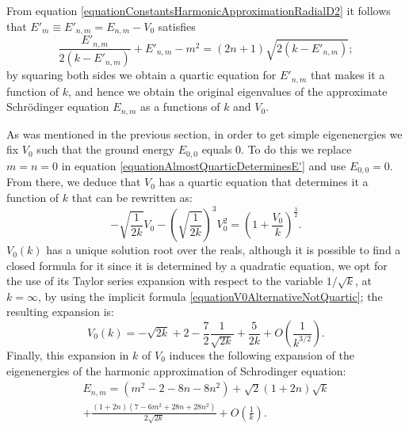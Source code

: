 From equation \eqref{equationConstantsHarmonicApproximationRadialD2} it follows that $E'_m \equiv E'_{n, m} = E_{n, m} - V_0$ satisfies
\begin{equation}\label{equationAlmostQuarticDeterminesE'}
    \frac{E'_{n, m}}{2(k - E'_{n, m})} + E'_{n, m} - m^2 = (2n+1) \sqrt{2(k - E'_{n, m})};
\end{equation}
by squaring both sides we obtain a quartic equation for $E'_{n,m}$ that makes it a function of $k$, and hence we obtain the original eigenvalues of the approximate Schr\"odinger equation $E_{n,m}$ as a functions of $k$ and $V_0$.

\lin

As was mentioned in the previous section, in order to get simple eigenenergies we fix $V_0$ such that the ground energy $E_{0, 0}$ equals $0$. To do this we replace $m = n = 0$ in equation \eqref{equationAlmostQuarticDeterminesE'} and use $E_{0, 0} = 0$. From there, we deduce that $V_0$ has a quartic equation that determines it a function of $k$ that can be rewritten as:
\begin{equation}\label{equationV0AlternativeNotQuartic}
    - \sqrt{\frac{1}{2k}}V_0 - \left( \sqrt{\frac{1}{2k}} \right)^3 V_0^2 = \left( 1 + \frac{V_0}{k} \right)^\frac{3}{2}.
\end{equation}
$V_0(k)$ has a unique solution root over the reals, although it is possible to find a closed formula for it since it is determined by a quadratic equation, we opt for the use of its Taylor series expansion with respect to the variable $1/\sqrt{k}$, at $k = \infty$, by using the implicit formula \eqref{equationV0AlternativeNotQuartic}; the resulting expansion is:
\begin{equation}\label{equationFormulaExpansionV0functionOfK}
    V_0(k) = - \sqrt{2k} + 2 - \frac{7}{2} \frac{1}{\sqrt{2k}} + \frac{5}{2k} + O\left(\frac{1}{k^{3/2}}\right).
\end{equation}
Finally, this expansion in $k$ of $V_0$ induces the following expansion of the eigenenergies of the harmonic approximation of Schrodinger equation:
\begin{multline}\label{equationEigenEnergies2DSchrodingerSolutionsHarmonicApproximation}
    E_{n, m} = (m^2 - 2 -8n -8n^2) +  \sqrt{2}(1+2n)\sqrt{k}\\+ \frac{(1+2n)(7-6m^2+28n+28n^2)}{2\sqrt{2k}}+  O\left(\frac{1}{k}\right).
\end{multline}

\lin 

